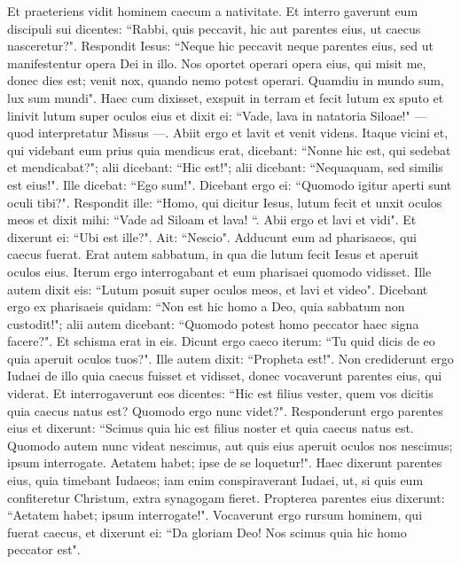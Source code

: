 \begin{biblechapter} 
\verse Et praeteriens vidit hominem caecum a nativitate. 
\verse Et interro gaverunt eum discipuli sui dicentes: “Rabbi, quis peccavit, hic aut parentes eius, ut caecus nasceretur?". 
\verse Respondit Iesus: “Neque hic peccavit neque parentes eius, sed ut manifestentur opera Dei in illo. 
\verse Nos oportet operari opera eius, qui misit me, donec dies est; venit nox, quando nemo potest operari. 
\verse Quamdiu in mundo sum, lux sum mundi". 
\verse Haec cum dixisset, exspuit in terram et fecit lutum ex sputo et linivit lutum super oculos eius 
\verse et dixit ei: “Vade, lava in natatoria Siloae!" — quod interpretatur Missus —. Abiit ergo et lavit et venit videns. 
\verse Itaque vicini et, qui videbant eum prius quia mendicus erat, dicebant: “Nonne hic est, qui sedebat et mendicabat?"; 
\verse alii dicebant: “Hic est!"; alii dicebant: “Nequaquam, sed similis est eius!". Ille dicebat: “Ego sum!". 
\verse Dicebant ergo ei: “Quomodo igitur aperti sunt oculi tibi?". 
\verse Respondit ille: “Homo, qui dicitur Iesus, lutum fecit et unxit oculos meos et dixit mihi: “Vade ad Siloam et lava! “. Abii ergo et lavi et vidi". 
\verse Et dixerunt ei: “Ubi est ille?". Ait: “Nescio". 
\verse Adducunt eum ad pharisaeos, qui caecus fuerat. 
\verse Erat autem sabbatum, in qua die lutum fecit Iesus et aperuit oculos eius. 
\verse Iterum ergo interrogabant et eum pharisaei quomodo vidisset. Ille autem dixit eis: “Lutum posuit super oculos meos, et lavi et video". 
\verse Dicebant ergo ex pharisaeis quidam: “Non est hic homo a Deo, quia sabbatum non custodit!"; alii autem dicebant: “Quomodo potest homo peccator haec signa facere?". Et schisma erat in eis. 
\verse Dicunt ergo caeco iterum: “Tu quid dicis de eo quia aperuit oculos tuos?". Ille autem dixit: “Propheta est!". 
\verse Non crediderunt ergo Iudaei de illo quia caecus fuisset et vidisset, donec vocaverunt parentes eius, qui viderat. 
\verse Et interrogaverunt eos dicentes: “Hic est filius vester, quem vos dicitis quia caecus natus est? Quomodo ergo nunc videt?". 
\verse Responderunt ergo parentes eius et dixerunt: “Scimus quia hic est filius noster et quia caecus natus est. 
\verse Quomodo autem nunc videat nescimus, aut quis eius aperuit oculos nos nescimus; ipsum interrogate. Aetatem habet; ipse de se loquetur!". 
\verse Haec dixerunt parentes eius, quia timebant Iudaeos; iam enim conspiraverant Iudaei, ut, si quis eum confiteretur Christum, extra synagogam fieret. 
\verse Propterea parentes eius dixerunt: “Aetatem habet; ipsum interrogate!". 
\verse Vocaverunt ergo rursum hominem, qui fuerat caecus, et dixerunt ei: “Da gloriam Deo! Nos scimus quia hic homo peccator est". 

\end{biblechapter}
